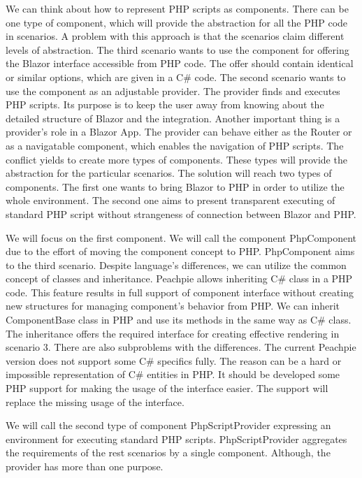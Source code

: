 \par
We can think about how to represent PHP scripts as components.
There can be one type of component, which will provide the abstraction for all the PHP code in scenarios.
A problem with this approach is that the scenarios claim different levels of abstraction.
The third scenario wants to use the component for offering the Blazor interface accessible from PHP code.
The offer should contain identical or similar options, which are given in a C\# code.
The second scenario wants to use the component as an adjustable provider.
The provider finds and executes PHP scripts.
Its purpose is to keep the user away from knowing about the detailed structure of Blazor and the integration.
Another important thing is a provider's role in a Blazor App.
The provider can behave either as the Router or as a navigatable component, which enables the navigation of PHP scripts.
The conflict yields to create more types of components.
These types will provide the abstraction for the particular scenarios.
The solution will reach two types of components.
The first one wants to bring Blazor to PHP in order to utilize the whole environment.
The second one aims to present transparent executing of standard PHP script without strangeness of connection between Blazor and PHP.
\par
We will focus on the first component.
We will call the component PhpComponent due to the effort of moving the component concept to PHP.
PhpComponent aims to the third scenario.
Despite language's differences, we can utilize the common concept of classes and inheritance.
Peachpie allows inheriting C\# class in a PHP code.
This feature results in full support of component interface without creating new structures for managing component's behavior from PHP.
We can inherit ComponentBase class in PHP and use its methods in the same way as C\# class.
The inheritance offers the required interface for creating effective rendering in scenario 3.
There are also subproblems with the differences.
The current Peachpie version does not support some C\# specifics fully.
The reason can be a hard or impossible representation of C\# entities in PHP.
It should be developed some PHP support for making the usage of the interface easier.
The support will replace the missing usage of the interface.
\par
We will call the second type of component PhpScriptProvider expressing an environment for executing standard PHP scripts.
PhpScriptProvider aggregates the requirements of the rest scenarios by a single component.
Although, the provider has more than one purpose.
